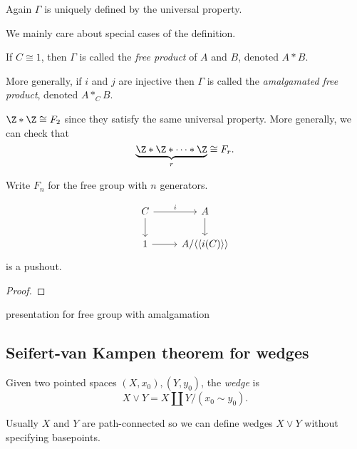 \documentclass[a4paper]{article}
\newcommand{\w}{\vee}
\begin{document}
Again \(\Gamma\) is uniquely defined by the universal property.

We mainly care about special cases of the definition.

\begin{definition}
  If \(C \cong 1\), then \(\Gamma\) is called the \emph{free product} of \(A\) and \(B\), denoted \(A * B\).

  More generally, if \(i\) and \(j\) are injective then \(\Gamma\) is called the \emph{amalgamated free product}, denoted \(A *_C B\).
\end{definition}

\begin{eg}
  \(\Z * \Z \cong F_2\) since they satisfy the same universal property. More generally, we can check that
  \[
    \underbrace{\Z * \Z * \dots * \Z}_r \cong F_r.
  \]
\end{eg}

\begin{notation}
  Write \(F_n\) for the free group with \(n\) generators.
\end{notation}

\begin{lemma}
  \[
    \begin{tikzcd}
      C \ar[r, "i"] \ar[d] & A \ar[d] \\
      1 \ar[r] & A /\langle \langle i(C) \rangle\rangle
    \end{tikzcd}
  \]
  is a pushout.
\end{lemma}

\begin{proof}
  \blindtext
\end{proof}

presentation for free group with amalgamation

\subsection{Seifert-van Kampen theorem for wedges}

\begin{definition}[wedge]
  Given two pointed spaces \((X, x_0), (Y, y_0)\), the \emph{wedge} is
  \[
    X \w Y = X \amalg Y /(x_0 \sim y_0).
  \]
\end{definition}

Usually \(X\) and \(Y\) are path-connected so we can define wedges \(X \w Y\) without specifying basepoints.
\end{document}

